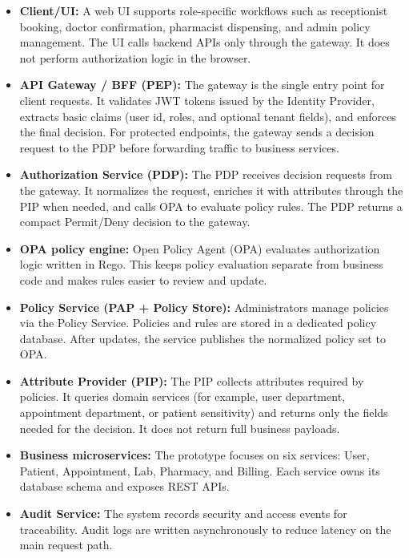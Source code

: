\begin{itemize}
    \item \textbf{Client/UI:} A web UI supports role-specific workflows such as receptionist booking,
    doctor confirmation, pharmacist dispensing, and admin policy management. The UI calls backend
    APIs only through the gateway. It does not perform authorization logic in the browser.

    \item \textbf{API Gateway / BFF (PEP):} The gateway is the single entry point for client requests.
    It validates JWT tokens issued by the Identity Provider, extracts basic claims (user id, roles, and
    optional tenant fields), and enforces the final decision. For protected endpoints, the gateway sends
    a decision request to the PDP before forwarding traffic to business services.

    \item \textbf{Authorization Service (PDP):} The PDP receives decision requests from the gateway.
    It normalizes the request, enriches it with attributes through the PIP when needed, and calls OPA
    to evaluate policy rules. The PDP returns a compact Permit/Deny decision to the gateway.

    \item \textbf{OPA policy engine:} Open Policy Agent (OPA) evaluates authorization logic written
    in Rego. This keeps policy evaluation separate from business code and makes rules easier to review
    and update.

    \item \textbf{Policy Service (PAP + Policy Store):} Administrators manage policies via the Policy
    Service. Policies and rules are stored in a dedicated policy database. After updates, the service
    publishes the normalized policy set to OPA.

    \item \textbf{Attribute Provider (PIP):} The PIP collects attributes required by policies. It queries
    domain services (for example, user department, appointment department, or patient sensitivity) and
    returns only the fields needed for the decision. It does not return full business payloads.

    \item \textbf{Business microservices:} The prototype focuses on six services: User, Patient,
    Appointment, Lab, Pharmacy, and Billing. Each service owns its database schema and exposes REST
    APIs.

    \item \textbf{Audit Service:} The system records security and access events for traceability. Audit
    logs are written asynchronously to reduce latency on the main request path.
\end{itemize}

